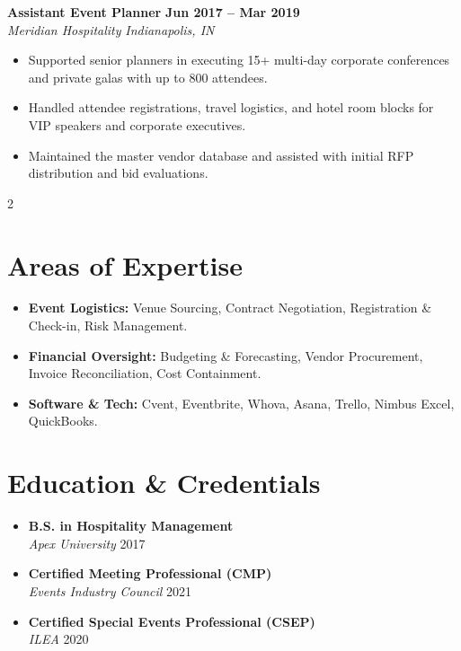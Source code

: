 \documentclass{article}
\begin{document}
\noindent\textbf{\color{primaryColor}Assistant Event Planner} \hfill \textbf{Jun 2017 -- Mar 2019}\\{}
\noindent\textit{Meridian Hospitality} \hfill \textit{Indianapolis, IN}\par
\vspace{3pt}
\begin{itemize}
  \item Supported senior planners in executing 15+ multi-day corporate conferences and private galas with up to 800 attendees.
  \item Handled attendee registrations, travel logistics, and hotel room blocks for VIP speakers and corporate executives.
  \item Maintained the master vendor database and assisted with initial RFP distribution and bid evaluations.
\end{itemize}

\vspace{8pt}

\begin{multicols}{2}
  \section*{Areas of Expertise}
  \begin{itemize}
    \item \textbf{Event Logistics:} Venue Sourcing, Contract Negotiation, Registration \& Check-in, Risk Management.
    \item \textbf{Financial Oversight:} Budgeting \& Forecasting, Vendor Procurement, Invoice Reconciliation, Cost Containment.
    \item \textbf{Software \& Tech:} Cvent, Eventbrite, Whova, Asana, Trello, Nimbus Excel, QuickBooks.
  \end{itemize}

  \columnbreak

  \section*{Education \& Credentials}
  \begin{itemize}
    \item \textbf{B.S. in Hospitality Management}\\{}
    \textit{Apex University} \hfill 2017
    \item \textbf{Certified Meeting Professional (CMP)}\\{}
    \textit{Events Industry Council} \hfill 2021
    \item \textbf{Certified Special Events Professional (CSEP)}\\{}
    \textit{ILEA} \hfill 2020
  \end{itemize}
\end{multicols}
\end{document}

